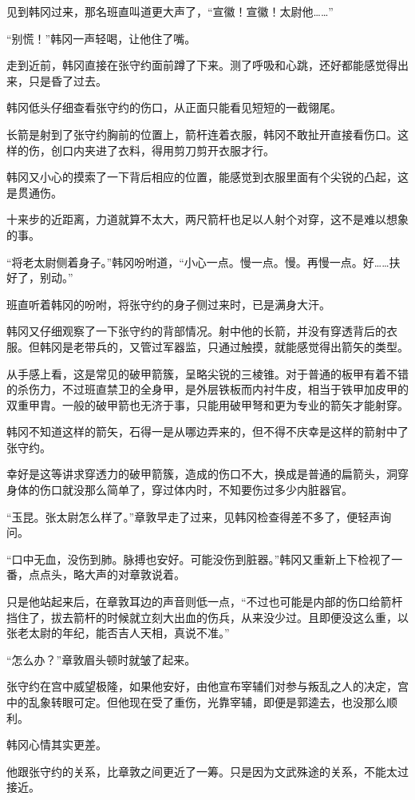 见到韩冈过来，那名班直叫道更大声了，“宣徽！宣徽！太尉他……”

“别慌！”韩冈一声轻喝，让他住了嘴。

走到近前，韩冈直接在张守约面前蹲了下来。测了呼吸和心跳，还好都能感觉得出来，只是昏了过去。

韩冈低头仔细查看张守约的伤口，从正面只能看见短短的一截翎尾。

长箭是射到了张守约胸前的位置上，箭杆连着衣服，韩冈不敢扯开直接看伤口。这样的伤，创口内夹进了衣料，得用剪刀剪开衣服才行。

韩冈又小心的摸索了一下背后相应的位置，能感觉到衣服里面有个尖锐的凸起，这是贯通伤。

十来步的近距离，力道就算不太大，两尺箭杆也足以人射个对穿，这不是难以想象的事。

“将老太尉侧着身子。”韩冈吩咐道，“小心一点。慢一点。慢。再慢一点。好……扶好了，别动。”

班直听着韩冈的吩咐，将张守约的身子侧过来时，已是满身大汗。

韩冈又仔细观察了一下张守约的背部情况。射中他的长箭，并没有穿透背后的衣服。但韩冈是老带兵的，又管过军器监，只通过触摸，就能感觉得出箭矢的类型。

从手感上看，这是常见的破甲箭簇，呈略尖锐的三棱锥。对于普通的板甲有着不错的杀伤力，不过班直禁卫的全身甲，是外层铁板而内衬牛皮，相当于铁甲加皮甲的双重甲胄。一般的破甲箭也无济于事，只能用破甲弩和更为专业的箭矢才能射穿。

韩冈不知道这样的箭矢，石得一是从哪边弄来的，但不得不庆幸是这样的箭射中了张守约。

幸好是这等讲求穿透力的破甲箭簇，造成的伤口不大，换成是普通的扁箭头，洞穿身体的伤口就没那么简单了，穿过体内时，不知要伤过多少内脏器官。

“玉昆。张太尉怎么样了。”章敦早走了过来，见韩冈检查得差不多了，便轻声询问。

“口中无血，没伤到肺。脉搏也安好。可能没伤到脏器。”韩冈又重新上下检视了一番，点点头，略大声的对章敦说着。

只是他站起来后，在章敦耳边的声音则低一点，“不过也可能是内部的伤口给箭杆挡住了，拔去箭杆的时候就立刻大出血的伤兵，从来没少过。且即便没这么重，以张老太尉的年纪，能否吉人天相，真说不准。”

“怎么办？”章敦眉头顿时就皱了起来。

张守约在宫中威望极隆，如果他安好，由他宣布宰辅们对参与叛乱之人的决定，宫中的乱象转眼可定。但他现在受了重伤，光靠宰辅，即便是郭逵去，也没那么顺利。

韩冈心情其实更差。

他跟张守约的关系，比章敦之间更近了一筹。只是因为文武殊途的关系，不能太过接近。

